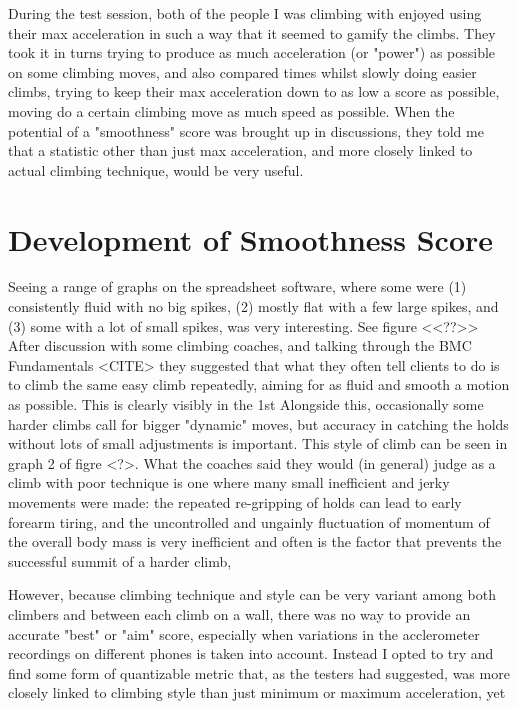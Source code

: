 During the test session, both of the people I was climbing with enjoyed using their max acceleration in such a way that it seemed to gamify the climbs.
They took it in turns trying to produce as much acceleration (or "power") as possible on some climbing moves, and also compared times whilst slowly doing easier climbs, trying to keep their max acceleration down to as low a score as possible, moving do a certain climbing move as much speed as possible.
When the potential of a "smoothness" score was brought up in discussions, they told me that a statistic other than just max acceleration, and more closely linked to actual climbing technique, would be very useful.


\section{Development of Smoothness Score}
Seeing a range of graphs on the spreadsheet software, where some were (1) consistently fluid with no big spikes, (2) mostly flat with a few large spikes,  and (3) some with a lot of small spikes, was very interesting. 
See figure <<??>>
After discussion with some climbing coaches, and talking through the BMC Fundamentals <CITE> they suggested that what they often tell clients to do is to climb the same easy climb repeatedly, aiming for as fluid and smooth a motion as possible. This is clearly visibly in the 1st
Alongside this, occasionally some harder climbs call for bigger "dynamic" moves, but accuracy in catching the holds without lots of small adjustments is important. This style of climb can be seen in graph 2 of figre <?>.
What the coaches said they would (in general) judge as a climb with poor technique is one where many small inefficient and jerky movements were made: the repeated re-gripping of holds can lead to early forearm tiring, and the uncontrolled and ungainly fluctuation of momentum of the overall body mass is very inefficient and often is the factor that prevents the successful summit of a harder climb,   

However, because climbing technique and style can be very variant among both climbers and between each climb on a wall, there was no way to provide an accurate "best" or "aim" score, especially when variations in the acclerometer recordings on different phones is taken into account.
Instead I opted to try and find some form of quantizable metric that, as the testers had suggested, was more closely linked to climbing style than just minimum or maximum acceleration, yet 


